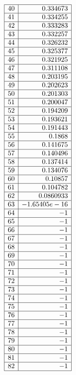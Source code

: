 \documentclass[12pt]{article}
\begin{document}
{$$\begin{array}{|r|r|}
\hline
40 & 0.334673\\
\hline
41 & 0.334255\\
\hline
42 & 0.333283\\
\hline
43 & 0.332257\\
\hline
44 & 0.326232\\
\hline
45 & 0.325377\\
\hline
46 & 0.321925\\
\hline
47 & 0.311108\\
\hline
48 & 0.203195\\
\hline
49 & 0.202623\\
\hline
50 & 0.201303\\
\hline
51 & 0.200047\\
\hline
52 & 0.194209\\
\hline
53 & 0.193621\\
\hline
54 & 0.191443\\
\hline
55 & 0.1868\\
\hline
56 & 0.141675\\
\hline
57 & 0.140496\\
\hline
58 & 0.137414\\
\hline
59 & 0.134076\\
\hline
60 & 0.10857\\
\hline
61 & 0.104782\\
\hline
62 & 0.0860933\\
\hline
63 & -1.65405e-16\\
\hline
64 & -1\\
\hline
65 & -1\\
\hline
66 & -1\\
\hline
67 & -1\\
\hline
68 & -1\\
\hline
69 & -1\\
\hline
70 & -1\\
\hline
71 & -1\\
\hline
72 & -1\\
\hline
73 & -1\\
\hline
74 & -1\\
\hline
75 & -1\\
\hline
76 & -1\\
\hline
77 & -1\\
\hline
78 & -1\\
\hline
79 & -1\\
\hline
80 & -1\\
\hline
81 & -1\\
\hline
82 & -1\\
\hline

\end{array}$$}
\end{document}
